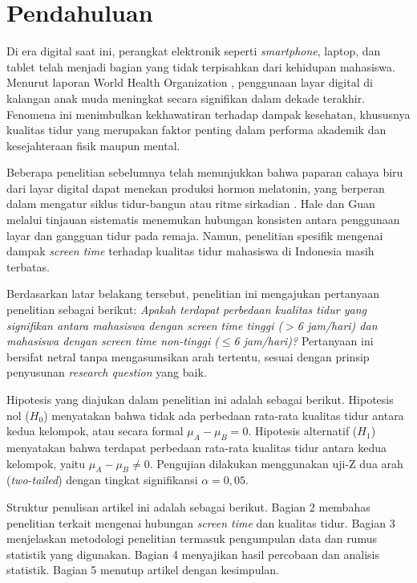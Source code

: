 \documentclass[metlit,article,accept,pdftex,moreauthors]{Definitions/mdpi}
\begin{document}
\section{Pendahuluan}

Di era digital saat ini, perangkat elektronik seperti \textit{smartphone}, laptop, dan tablet telah menjadi bagian yang tidak terpisahkan dari kehidupan mahasiswa. Menurut laporan World Health Organization \cite{WHO2024screentime}, penggunaan layar digital di kalangan anak muda meningkat secara signifikan dalam dekade terakhir. Fenomena ini menimbulkan kekhawatiran terhadap dampak kesehatan, khususnya kualitas tidur yang merupakan faktor penting dalam performa akademik dan kesejahteraan fisik maupun mental.

Beberapa penelitian sebelumnya telah menunjukkan bahwa paparan cahaya biru dari layar digital dapat menekan produksi hormon melatonin, yang berperan dalam mengatur siklus tidur-bangun atau ritme sirkadian \cite{chang2015evening}. Hale dan Guan \cite{hale2015screen} melalui tinjauan sistematis menemukan hubungan konsisten antara penggunaan layar dan gangguan tidur pada remaja. Namun, penelitian spesifik mengenai dampak \textit{screen time} terhadap kualitas tidur mahasiswa di Indonesia masih terbatas.

Berdasarkan latar belakang tersebut, penelitian ini mengajukan pertanyaan penelitian sebagai berikut: \textit{Apakah terdapat perbedaan kualitas tidur yang signifikan antara mahasiswa dengan screen time tinggi ({$>$}6 jam/hari) dan mahasiswa dengan screen time non-tinggi ($\leq$6 jam/hari)?} Pertanyaan ini bersifat netral tanpa mengasumsikan arah tertentu, sesuai dengan prinsip penyusunan \textit{research question} yang baik.

Hipotesis yang diajukan dalam penelitian ini adalah sebagai berikut. Hipotesis nol ($H_0$) menyatakan bahwa tidak ada perbedaan rata-rata kualitas tidur antara kedua kelompok, atau secara formal $\mu_A - \mu_B = 0$. Hipotesis alternatif ($H_1$) menyatakan bahwa terdapat perbedaan rata-rata kualitas tidur antara kedua kelompok, yaitu $\mu_A - \mu_B \neq 0$. Pengujian dilakukan menggunakan uji-Z dua arah (\textit{two-tailed}) dengan tingkat signifikansi $\alpha = 0{,}05$.

Struktur penulisan artikel ini adalah sebagai berikut. Bagian 2 membahas penelitian terkait mengenai hubungan \textit{screen time} dan kualitas tidur. Bagian 3 menjelaskan metodologi penelitian termasuk pengumpulan data dan rumus statistik yang digunakan. Bagian 4 menyajikan hasil percobaan dan analisis statistik. Bagian 5 menutup artikel dengan kesimpulan.
\end{document}
